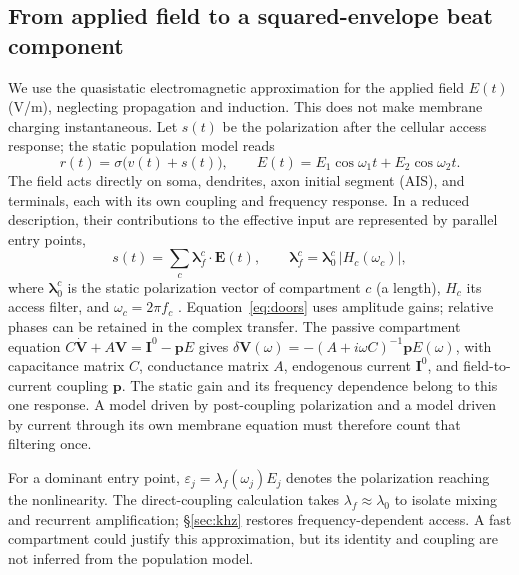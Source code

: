 \documentclass[11pt,a4paper]{article}
\newcommand{\Sig}{\sigma}
\begin{document}
\subsection{From applied field to a squared-envelope beat component}\label{sec:coupling}
We use the quasistatic electromagnetic approximation for the applied field $E(t)$
(V/m), neglecting propagation and induction. This does not make membrane charging
instantaneous. Let $s(t)$ be the polarization after the cellular access response;
the static population model reads
\begin{equation}
r(t)=\Sig\!\big(v(t)+s(t)\big),\qquad
E(t)=E_1\cos\omega_1 t+E_2\cos\omega_2 t .
\label{eq:coupling}
\end{equation}
The field acts directly on soma, dendrites, axon initial segment (AIS), and terminals,
each with its own coupling and frequency response. In a reduced description, their
contributions to the effective input are represented by parallel entry points,
\begin{equation}
s(t)=\sum_c \boldsymbol\lambda^c_f\!\cdot\!\mathbf E(t),\qquad
\boldsymbol\lambda^c_f=\boldsymbol\lambda^c_0\,\lvert H_c(\omega_c)\rvert,
\label{eq:doors}
\end{equation}
where $\boldsymbol\lambda^c_0$ is the static polarization vector of compartment $c$ (a length),
$H_c$ its access filter, and $\omega_c=2\pi f_c$
\cite{ruffini2025rosetta,galangadea2023}. Equation~\eqref{eq:doors} uses amplitude
gains; relative phases can be retained in the complex transfer. The passive
compartment equation $C\dot{\mathbf V}+A\mathbf V=\mathbf I^0-\mathbf pE$
\cite{ruffini2021nmm2} gives
$\delta\mathbf V(\omega)=-(A+i\omega C)^{-1}\mathbf pE(\omega)$, with capacitance
matrix $C$, conductance matrix $A$, endogenous current $\mathbf I^0$, and field-to-current
coupling $\mathbf p$. The static gain and its frequency dependence belong to this
one response. A model driven by post-coupling polarization and a model driven by
current through its own membrane equation must therefore count that filtering once.

For a dominant entry point, $\varepsilon_j=\lambda_f(\omega_j)E_j$ denotes the
polarization reaching the nonlinearity. The direct-coupling calculation takes
$\lambda_f\approx\lambda_0$ to isolate mixing and recurrent amplification;
\S\ref{sec:khz} restores frequency-dependent access. A fast compartment could
justify this approximation, but its identity and coupling are not inferred from
the population model.
\end{document}
